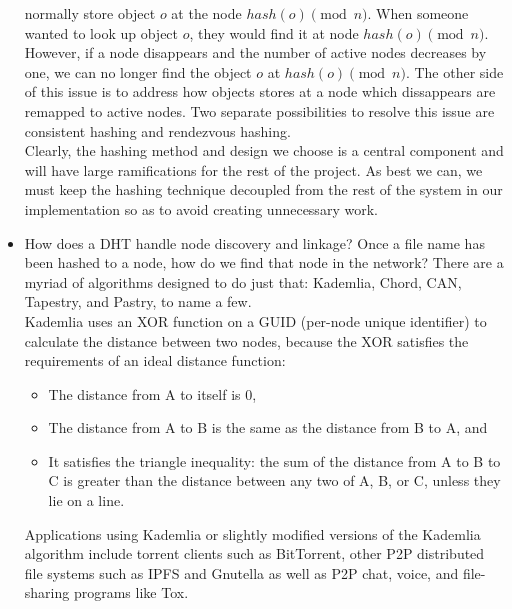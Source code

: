 \documentclass[12pt]{report}
\begin{document}
\begin{itemize}
            normally store object $o$ at the node $hash(o) \pmod n$.  When
            someone wanted to look up object $o$, they would find it at node
            $hash(o) \pmod n$.  However, if a node disappears and the number of
            active nodes decreases by one, we can no longer find the object $o$
            at $hash(o) \pmod n$.  The other side of this issue is to address how
            objects stores at a node which dissappears are remapped to active
            nodes.  Two separate possibilities to resolve this issue are
            consistent hashing and rendezvous hashing.\\
            Clearly, the hashing method and design we choose is a central
            component and will have large ramifications for the rest of the
            project.  As best we can, we must keep the hashing technique
            decoupled from the rest of the system in our implementation so as to
            avoid creating unnecessary work.

        \item How does a DHT handle node discovery and linkage? Once a file name
            has been hashed to a node, how do we find that node in the network?
            There are a myriad of algorithms designed to do just that:
            Kademlia\cite{kademlia}, Chord\cite{chord}, CAN,
            Tapestry\cite{tapestry}, and
            Pastry\cite{pastry}, to name a few.\\
            Kademlia uses an XOR function on a GUID (per-node unique identifier)
            to calculate the distance between two nodes, because the XOR
            satisfies the requirements of an ideal distance function:
            \begin{itemize}
                \item The distance from A to itself is 0,
                \item The distance from A to B is the same as the distance from
                    B to A, and
                \item It satisfies the triangle inequality: the sum of the
                    distance from A to B to C is greater than the distance
                    between any two of A, B, or C, unless they lie on a line.
            \end{itemize}
            Applications using Kademlia or slightly modified versions of the
            Kademlia algorithm include torrent clients such as BitTorrent, other
            P2P distributed file systems such as IPFS and Gnutella as well as
            P2P chat, voice, and file-sharing programs like Tox.
    \end{itemize}
\end{document}
